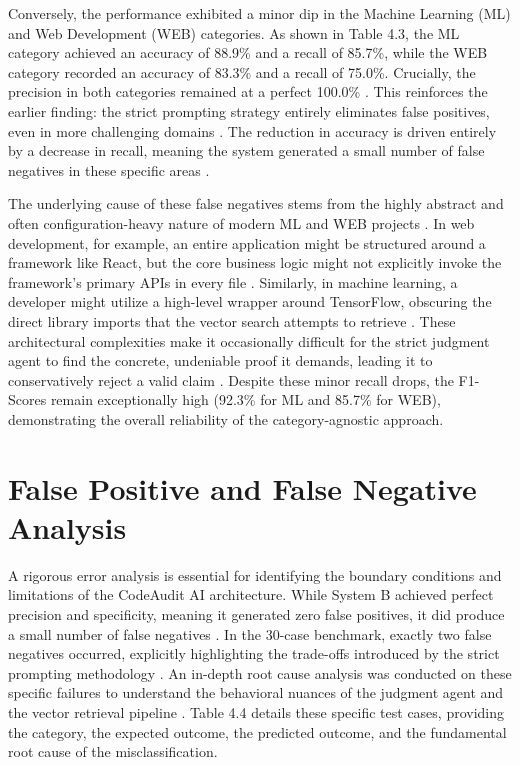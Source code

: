 Conversely, the performance exhibited a minor dip in the Machine Learning (ML) and Web Development (WEB) categories. As shown in Table 4.3, the ML category achieved an accuracy of 88.9\% and a recall of 85.7\%, while the WEB category recorded an accuracy of 83.3\% and a recall of 75.0\%. Crucially, the precision in both categories remained at a perfect 100.0\% \cite{ref43}. This reinforces the earlier finding: the strict prompting strategy entirely eliminates false positives, even in more challenging domains \cite{ref34}. The reduction in accuracy is driven entirely by a decrease in recall, meaning the system generated a small number of false negatives in these specific areas \cite{ref19}. 

The underlying cause of these false negatives stems from the highly abstract and often configuration-heavy nature of modern ML and WEB projects \cite{ref24, ref28}. In web development, for example, an entire application might be structured around a framework like React, but the core business logic might not explicitly invoke the framework's primary APIs in every file \cite{ref25}. Similarly, in machine learning, a developer might utilize a high-level wrapper around TensorFlow, obscuring the direct library imports that the vector search attempts to retrieve \cite{ref22}. These architectural complexities make it occasionally difficult for the strict judgment agent to find the concrete, undeniable proof it demands, leading it to conservatively reject a valid claim \cite{ref74}. Despite these minor recall drops, the F1-Scores remain exceptionally high (92.3\% for ML and 85.7\% for WEB), demonstrating the overall reliability of the category-agnostic approach.

\section{False Positive and False Negative Analysis}

A rigorous error analysis is essential for identifying the boundary conditions and limitations of the CodeAudit AI architecture. While System B achieved perfect precision and specificity, meaning it generated zero false positives, it did produce a small number of false negatives \cite{ref63, ref75}. In the 30-case benchmark, exactly two false negatives occurred, explicitly highlighting the trade-offs introduced by the strict prompting methodology \cite{ref76}. An in-depth root cause analysis was conducted on these specific failures to understand the behavioral nuances of the judgment agent and the vector retrieval pipeline \cite{ref65}. Table 4.4 details these specific test cases, providing the category, the expected outcome, the predicted outcome, and the fundamental root cause of the misclassification.


